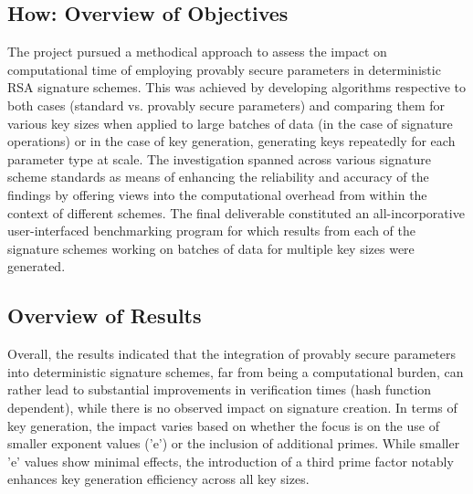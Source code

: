 \documentclass[]{final_report}
\theoremstyle{definition}
\begin{document}
\subsection{How: Overview of Objectives}
The project pursued a methodical approach to assess the impact on computational time of employing provably secure parameters in deterministic RSA signature schemes. This was achieved by developing algorithms respective to both cases (standard vs. provably secure parameters) and comparing them for various key sizes when applied to large batches of data (in the case of signature operations) or in the case of key generation, generating keys repeatedly for each parameter type at scale.
The investigation spanned across various signature scheme standards as means of enhancing the reliability and accuracy of the findings by offering views into the computational overhead from within the context of different schemes. The final deliverable constituted an all-incorporative user-interfaced benchmarking program for which results from each of the signature schemes working on batches of data for multiple key sizes were generated.

\subsection{Overview of Results}
Overall, the results indicated that the integration of provably secure parameters into deterministic signature schemes, far from being a computational burden, can rather lead to substantial improvements in verification times (hash function dependent), while there is no observed impact on signature creation. In terms of key generation, the impact varies based on whether the focus is on the use of smaller exponent values ('e') or the inclusion of additional primes. While smaller 'e' values show minimal effects, the introduction of a third prime factor notably enhances key generation efficiency across all key sizes.
\end{document}
